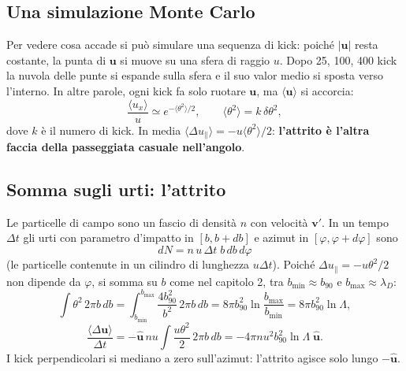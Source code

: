 \subsection{Una simulazione Monte Carlo}
Per vedere cosa accade si può simulare una sequenza di kick: poiché $|\mathbf{u}|$ resta costante, la punta di $\mathbf{u}$ si muove su una sfera di raggio $u$. Dopo 25, 100, 400 kick la nuvola delle punte si espande sulla sfera e il suo valor medio si sposta verso l'interno. In altre parole, ogni kick fa solo ruotare $\mathbf{u}$, ma $\langle\mathbf{u}\rangle$ si accorcia:
\begin{equation}
\frac{\langle u_x\rangle}{u}\simeq e^{-\langle\theta^2\rangle/2},\qquad\langle\theta^2\rangle=k\,\delta\theta^2,
\end{equation}
dove $k$ è il numero di kick. In media $\langle\Delta u_\parallel\rangle=-u\langle\theta^2\rangle/2$: \textbf{l'attrito è l'altra faccia della passeggiata casuale nell'angolo}.

\subsection{Somma sugli urti: l'attrito}
Le particelle di campo sono un fascio di densità $n$ con velocità $\mathbf{v}'$. In un tempo $\Delta t$ gli urti con parametro d'impatto in $[b,b+db]$ e azimut in $[\varphi,\varphi+d\varphi]$ sono
\begin{equation}
dN=n\,u\,\Delta t\;b\,db\,d\varphi
\end{equation}
(le particelle contenute in un cilindro di lunghezza $u\Delta t$). Poiché $\Delta u_\parallel=-u\theta^2/2$ non dipende da $\varphi$, si somma su $b$ come nel capitolo 2, tra $b_{\min}\approx b_{90}$ e $b_{\max}\approx\lambda_D$:
\begin{equation}
\int\theta^2\,2\pi b\,db=\int_{b_{\min}}^{b_{\max}}\frac{4b_{90}^2}{b^2}\,2\pi b\,db=8\pi b_{90}^2\ln\frac{b_{\max}}{b_{\min}}=8\pi b_{90}^2\ln\Lambda,
\end{equation}
\begin{equation}
\frac{\langle\Delta\mathbf{u}\rangle}{\Delta t}=-\hat{\mathbf{u}}\,nu\int\frac{u\theta^2}{2}\,2\pi b\,db=-4\pi n u^2b_{90}^2\ln\Lambda\;\hat{\mathbf{u}}.
\end{equation}
I kick perpendicolari si mediano a zero sull'azimut: l'attrito agisce solo lungo $-\hat{\mathbf{u}}$.

